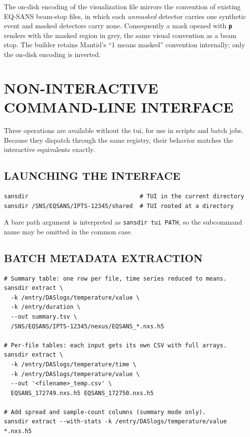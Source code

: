 \documentclass[tm]{ornltm}
\newcommand{\key}[1]{\textbf{\texttt{#1}}}
\begin{document}
The on-disk encoding of the visualization file mirrors the convention of existing
EQ-SANS beam-stop files, in which each \emph{unmasked} detector carries one
synthetic event and masked detectors carry none. Consequently a mask opened with
\key{p} renders with the masked region in grey, the same visual convention as a
beam stop. The builder retains Mantid's ``1 means masked'' convention internally;
only the on-disk encoding is inverted.

\section{NON-INTERACTIVE COMMAND-LINE INTERFACE}
\label{sec:cli}

Three operations are available without the \ac{tui}, for use in scripts and
batch jobs. Because they dispatch through the same registry, their behavior
matches the interactive equivalents exactly.

\subsection{LAUNCHING THE INTERFACE}

\begin{lstlisting}[language=shellsession]
sansdir                                # TUI in the current directory
sansdir /SNS/EQSANS/IPTS-12345/shared  # TUI rooted at a directory
\end{lstlisting}

A bare path argument is interpreted as \texttt{sansdir tui PATH}, so the
subcommand name may be omitted in the common case.

\subsection{BATCH METADATA EXTRACTION}

\begin{lstlisting}[language=shellsession]
# Summary table: one row per file, time series reduced to means.
sansdir extract \
  -k /entry/DASlogs/temperature/value \
  -k /entry/duration \
  --out summary.tsv \
  /SNS/EQSANS/IPTS-12345/nexus/EQSANS_*.nxs.h5

# Per-file tables: each input gets its own CSV with full arrays.
sansdir extract \
  -k /entry/DASlogs/temperature/time \
  -k /entry/DASlogs/temperature/value \
  --out '<filename>_temp.csv' \
  EQSANS_172749.nxs.h5 EQSANS_172750.nxs.h5

# Add spread and sample-count columns (summary mode only).
sansdir extract --with-stats -k /entry/DASlogs/temperature/value *.nxs.h5
\end{lstlisting}
\end{document}
